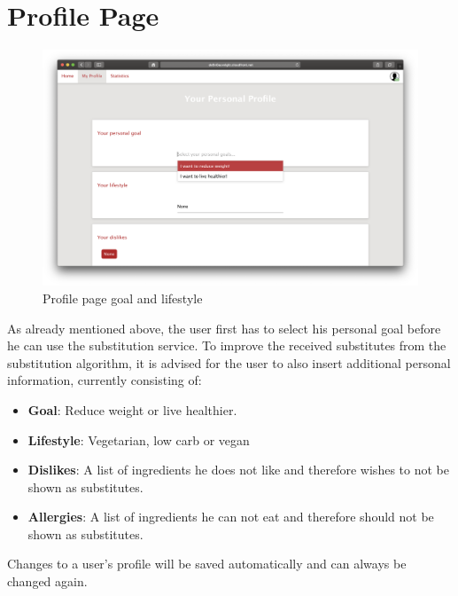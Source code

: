 \section*{Profile Page}

\vspace{-1em}
\begin{figure}[H]
	\captionsetup{justification=centering}
	\begin{center}
		\includegraphics[scale=0.25]{Ressourcen/img/screenshots/screenshotO.png}
		\vspace{-2em}
		\caption{Profile page goal and lifestyle}
	\end{center}
\end{figure}
\vspace{-3.5em}
As already mentioned above, the user first has to select his personal goal before he can use the substitution service. To improve the received substitutes from the substitution algorithm, it is advised for the user to also insert additional personal information, currently consisting of:
\vspace{-3em}

\begin{itemize}
\item \textbf{Goal}: Reduce weight or live healthier.
\item \textbf{Lifestyle}: Vegetarian, low carb or vegan
\item \textbf{Dislikes}: A list of ingredients he does not like and therefore wishes to not be shown as substitutes.
\item \textbf{Allergies}: A list of ingredients he can not eat and therefore should not be shown as substitutes.
\end{itemize}
\vspace{-1em}
Changes to a user’s profile will be saved automatically and can always be changed again.
\vspace{-1em}


